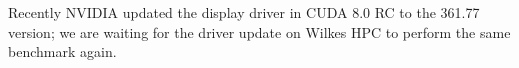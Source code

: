 \documentclass[conference]{IEEEtran}
\begin{document}


Recently NVIDIA updated the display driver in CUDA 8.0 RC to the 361.77 version; we are waiting for the driver update on Wilkes HPC to perform the same benchmark again.

%
%



%
%
\end{document}
